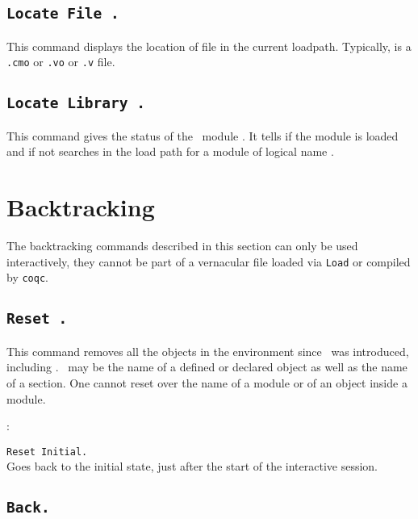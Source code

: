 \subsection[\tt Locate File {\str}.]{\tt Locate File {\str}.\label{Locate File}}
This command displays the location of file {\str} in the current loadpath.
Typically, {\str} is a \texttt{.cmo} or \texttt{.vo} or \texttt{.v} file.

\subsection[\tt Locate Library {\dirpath}.]{\tt Locate Library {\dirpath}.\label{Locate Library}}
This command gives the status of the \Coq\ module {\dirpath}. It tells if the
module is loaded and if not searches in the load path for a module
of logical name {\dirpath}.

\section{Backtracking}

The backtracking commands described in this section can only be used
interactively, they cannot be part of a vernacular file loaded via
{\tt Load} or compiled by {\tt coqc}.

\subsection[\tt Reset \ident.]{\tt Reset \ident.}
This command removes all the objects in the environment since \ident\ 
was introduced, including \ident. \ident\ may be the name of a defined
or declared object as well as the name of a section. One cannot reset
over the name of a module or of an object inside a module.

\begin{ErrMsgs}
\item \ident: 
\end{ErrMsgs}

\begin{Variants}
 \item {\tt Reset Initial.}\\
   Goes back to the initial state, just after the start of the
   interactive session.
\end{Variants}

\subsection[\tt Back.]{\tt Back.}

